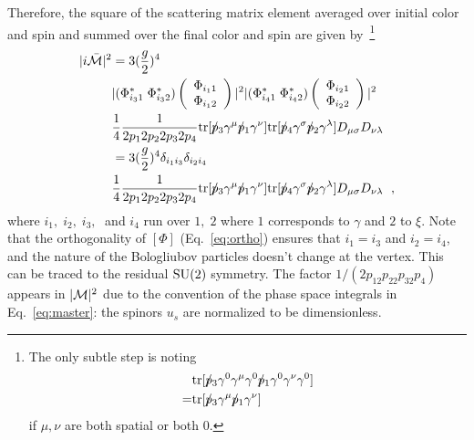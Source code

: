 \documentclass[10pt, aps, prd, superscriptaddress, nofootinbib, 
               amsmath, amssymb, twocolumn,
               preprintnumbers, showpacs,
               raggedbottom,
               floatfix]{revtex4-1}
\newcommand{\calM}{{\cal{M}}}
\newcommand{\slsh}[1]{#1\!\!\!/}
\newcommand{\tr}{{\rm{tr}}}
\newcommand{\SU}{{\rm{SU}}}
\begin{document}
Therefore, the square of the scattering matrix element averaged over initial
color and spin and summed over the final color and spin are given
by~\footnote{The only subtle step is noting 
\begin{equation}
\begin{split}
&\tr[\slsh{p}_3\gamma^0\gamma^\mu\gamma^0\slsh{p}_1\gamma^0\gamma^\nu\gamma^0]\\
=&\tr[\slsh{p}_3\gamma^\mu\slsh{p}_1\gamma^\nu]
\end{split}
\end{equation}
if $\mu, \nu$ are both spatial or both $0$.
}
\begin{equation}
\begin{split}
|i\bar{\cal{M}}|^2 &= 3(\frac{g}{2})^4\\
&
|(\Phi^*_{i_31}\;\Phi^*_{i_32})
\left(\begin{array}{c}\Phi_{i_11}\\ \Phi_{i_12}\end{array}\right)|^2
|(\Phi^*_{i_41}\;\Phi^*_{i_42})
\left(\begin{array}{c}\Phi_{i_21}\\ \Phi_{i_22}\end{array}\right)|^2\\
&
\frac{1}{4}\frac{1}{2p_12p_22p_32p_4}\tr[\slsh{p}_3\gamma^\mu\slsh{p}_1\gamma^\nu]
   \tr[\slsh{p}_4\gamma^\sigma\slsh{p}_2\gamma^\lambda]
   {D}_{\mu\sigma}{D}_{\nu\lambda}\\
   &= 3(\frac{g}{2})^4\delta_{i_1i_3}\delta_{i_2i_4}\\
&
\frac{1}{4}\frac{1}{2p_12p_22p_32p_4}\tr[\slsh{p}_3\gamma^\mu\slsh{p}_1\gamma^\nu]
   \tr[\slsh{p}_4\gamma^\sigma\slsh{p}_2\gamma^\lambda]
   {D}_{\mu\sigma}{D}_{\nu\lambda}
   ~\label{eq:M2SU2}\;,
\end{split}
\end{equation}
where $i_1,\; i_2,\; i_3,\;$ and $i_4$ run over $1,\; 2$ where $1$ corresponds to
$\gamma$ and $2$ to $\xi$. Note that the orthogonality of $[\Phi]$ 
(Eq.~\ref{eq:ortho}) ensures that $i_1=i_3$ and $i_2=i_4$, and the nature of the
Bologliubov particles doesn't change at the vertex. This can be traced to the
residual $\SU(2)$ symmetry. The factor ${1}/{(2p_12p_22p_32p_4)}$ appears in
$|\calM|^2$ due to the convention of the phase space integrals in
Eq.~\ref{eq:master}: the spinors $u_s$ are normalized to be dimensionless.
\end{document}
